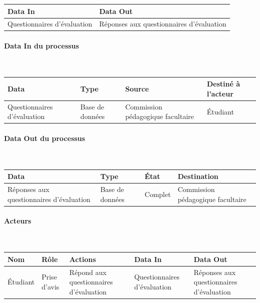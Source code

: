\documentclass[a4paper,11pt]{report}
\begin{document}
\begin{tabularx}{\linewidth}{|X|X|} \hline
Data In & Data Out \\ \hline
Questionnaires d'évaluation & Réponses aux questionnaires d'évaluation\\ \hline
\end{tabularx}

\paragraph{Data In du processus}~\newline{}

\begin{tabularx}{\linewidth}{|X|X|X|X|} \hline
Data & Type & Source & Destiné à l'acteur \\ \hline
Questionnaires d'évaluation & Base de données & Commission pédagogique facultaire & Étudiant \\ \hline
\end{tabularx}

\paragraph{Data Out du processus}~\newline{}

\begin{tabularx}{\linewidth}{|X|X|X|X|} \hline
Data & Type & État & Destination \\ \hline
Réponses aux questionnaires d'évaluation & Base de données & Complet & Commission pédagogique facultaire \\ \hline
\end{tabularx}

\paragraph{Acteurs}~\newline{}

\begin{tabularx}{\linewidth}{|X|X|X|X|X|} \hline
Nom & Rôle & Actions & Data In & Data Out \\ \hline 
Étudiant & Prise d'avis & Répond aux questionnaires d'évaluation & Questionnaires d'évaluation & Réponses aux questionnaires d'évaluation \\ \hline
\end{tabularx}
\end{document}
